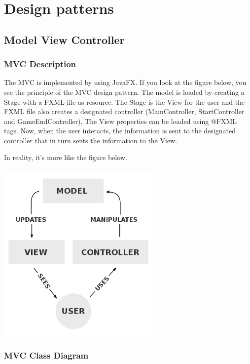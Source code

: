 \chapter{Design patterns}

\section{Model View Controller}

\subsection{MVC Description}
The MVC is implemented by using JavaFX. If you look at the figure below, you see the principle of the MVC design pattern. The model is loaded by creating a Stage with a FXML file as resource. The Stage is the View for the user and the FXML file also creates a designated controller (MainController, StartController and GameEndController). The View properties can be loaded using @FXML tags. Now, when the user interacts, the information is sent to the designated controller that in turn sents the information to the View. 

In reality, it's more like the figure below.
\\\\
\includegraphics[width=80mm]{MVC.png}

\subsection{MVC Class Diagram}

